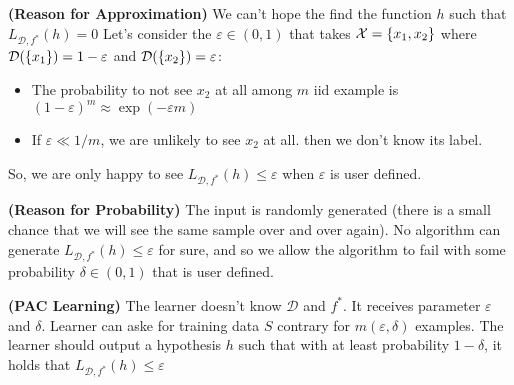\begin{remark}{\textbf{(Reason for Approximation)}}
    We can't hope the find the function $h$ such that $L_{\mathcal{D}, f^*}(h) = 0$ Let's consider the $\varepsilon \in (0, 1)$ that takes $\mathcal{X} = \left\{ x_1,x_2 \right\}$ where $\mathcal{D}(\left\{ x_1 \right\}) = 1-\varepsilon$ and $\mathcal{D}(\left\{ x_2 \right\}) = \varepsilon$:
    \begin{itemize}
        \item The probability to not see $x_2$ at all among $m$ iid example is $(1-\varepsilon)^m \approx \exp(-\varepsilon m)$
        \item If $\varepsilon\ll1/m$, we are unlikely to see $x_2$ at all. then we don't know its label.
    \end{itemize}
    So, we are only happy to see $L_{\mathcal{D}, f^*}(h)\le\varepsilon$ when $\varepsilon$ is user defined.
\end{remark}

\begin{remark}{\textbf{(Reason for Probability)}}
    The input is randomly generated (there is a small chance that we will see the same sample over and over again). No algorithm can generate $L_{\mathcal{D}, f^*}(h)\le\varepsilon$ for sure, and so we allow the algorithm to fail with some probability $\delta\in(0, 1)$ that is user defined. 
\end{remark}

\begin{definition}{\textbf{(PAC Learning)}}
    The learner doesn't know $\mathcal{D}$ and $f^*$. It receives parameter $\varepsilon$ and $\delta$. Learner can aske for training data $S$ contrary for $m(\varepsilon, \delta)$ examples. The learner should output a hypothesis $h$ such that with at least probability $1-\delta$, it holds that $L_{\mathcal{D}, f^*}(h)\le\varepsilon$
\end{definition}

